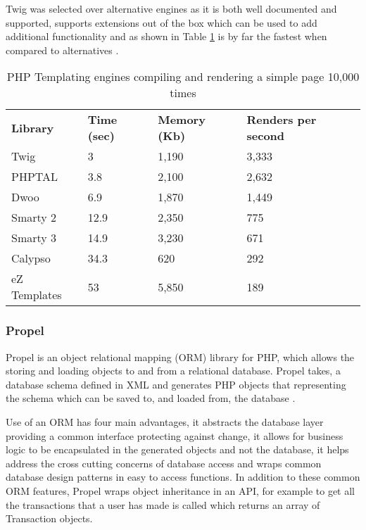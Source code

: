 Twig was selected over alternative engines as it is both well documented and supported, supports extensions out of the box which can be used to add additional functionality and as shown in Table \ref{table:twigbenchmarked} is by far the fastest when compared to alternatives \parencite{potencier2009templating}.

\begin{table}[h]
\begin{tabular}{llll}
\textbf{Library} & \textbf{Time (sec)} & \textbf{Memory (Kb)} & \textbf{Renders per second} \\
Twig             & 3                   & 1,190                & 3,333                                  \\
PHPTAL           & 3.8                 & 2,100                & 2,632                                  \\
Dwoo             & 6.9                 & 1,870                & 1,449                                  \\
Smarty 2         & 12.9                & 2,350                & 775                                    \\
Smarty 3         & 14.9                & 3,230                & 671                                    \\
Calypso          & 34.3                & 620                  & 292                                    \\
eZ Templates     & 53                  & 5,850                & 189                                   
\end{tabular}
\caption[PHP Templating engine benchmarks]{PHP Templating engines compiling and rendering a simple page 10,000 times \parencite{potencier2009templating}}
\label{table:twigbenchmarked}
\end{table}

\subsubsection{Propel}
Propel is an object relational mapping (ORM) library for PHP, which allows the storing and loading objects to and from a relational database.
%
Propel takes, a database schema defined in XML and generates PHP objects that representing the schema which can be saved to, and loaded from, the database \parencite{propel2014orm}.

Use of an ORM has four main advantages, it abstracts the database layer providing a common interface protecting against change, it allows for business logic to be  encapsulated in the generated objects and not the database, it helps address the cross cutting concerns of database access and wraps common database design patterns in easy to access functions. In addition to these common ORM features, Propel wraps object inheritance in an API, for example to get all the transactions that a user has made  is called which returns an array of Transaction objects.

